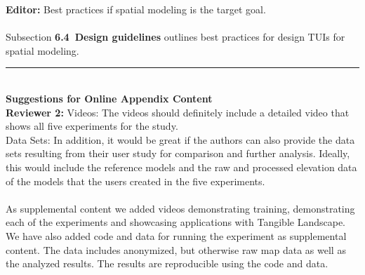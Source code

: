 \documentclass[prodmode,acmtochi]{acmsmall} %
\newcommand{\doublerule}[1][.4pt]{%
  \noindent
  \makebox[0pt][l]{\rule[.7ex]{\linewidth}{#1}}%
  \rule[.3ex]{\linewidth}{#1}}
\begin{document}
\textbf{Editor:} Best practices if spatial modeling is the target goal.\\

\hrulefill \\

Subsection \textbf{6.4~Design guidelines} outlines best practices
for design TUIs for spatial modeling. \\

\doublerule \\

\textbf{Suggestions for Online Appendix Content} \\

\textbf{Reviewer 2:} 
Videos: 
The videos should definitely include a detailed video that shows all five experiments for the study.\\

Data Sets:
In addition, it would be great if the authors can also provide the data sets resulting from their user study for comparison and further analysis. Ideally, this would include the reference models and the raw and processed elevation data of the models that the users created in the five experiments.\\

\hrulefill \\

As supplemental content
we added videos demonstrating training, 
demonstrating each of the experiments 
and showcasing applications with Tangible Landscape.\\

We have also added code and data for running the experiment
as supplemental content. The data includes anonymized, 
but otherwise raw map data as well as the analyzed results.
The results are reproducible using the code and data.\\




\end{document}

